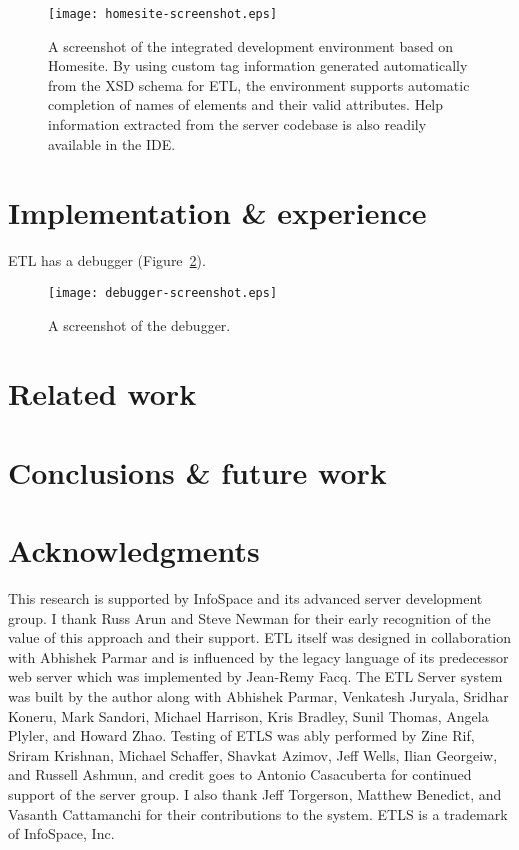 \documentclass{www2003-submission}
\newcommand{\figref}[1]{Figure~\ref{fig-#1}}
\begin{document}
\begin{figure}[tb]
\begin{centering}
\hspace*{-0.05\linewidth}\texttt{[image: homesite-screenshot.eps]}

\caption{A screenshot of the integrated development environment based
on Homesite.  By using custom tag information generated automatically
from the XSD schema for ETL, the environment supports automatic
completion of names of elements and their valid attributes.  Help
information extracted from the server codebase is also readily
available in the IDE\@.
\label{fig-homesite-screenshot}}
\end{centering}
\end{figure}


\section{Implementation \& experience}

ETL has a debugger (\figref{debugger-screenshot}).

\begin{figure}[tb]
\begin{centering}
\hspace*{-0.07\linewidth}\texttt{[image: debugger-screenshot.eps]}
\caption{A screenshot of the debugger.
\label{fig-debugger-screenshot}}
\end{centering}
\end{figure}


\section{Related work}



\section{Conclusions \& future work}


\section{Acknowledgments}
This research is supported by InfoSpace and its advanced server
development group.  I thank Russ Arun and Steve Newman for their early
recognition of the value of this approach and their support.  ETL
itself was designed in collaboration with Abhishek Parmar and is
influenced by the legacy language of its predecessor web server which
was implemented by Jean-Remy Facq.  The ETL Server system was built by
the author along with Abhishek Parmar, Venkatesh Juryala, Sridhar
Koneru, Mark Sandori, Michael Harrison, Kris Bradley, Sunil Thomas,
Angela Plyler, and Howard Zhao.  Testing of ETLS was ably performed by
Zine Rif, Sriram Krishnan, Michael Schaffer, Shavkat Azimov, Jeff
Wells, Ilian Georgeiw, and Russell Ashmun, and credit goes to Antonio
Casacuberta for continued support of the server group.  I also thank
Jeff Torgerson, Matthew Benedict, and Vasanth Cattamanchi for their
contributions to the system. ETLS is a trademark of InfoSpace, Inc.
\end{document}
